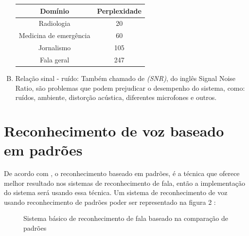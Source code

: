 \begin{enumerate}[A)]
\begin{table}[H]
\begin{tabular}{cc}
\hline %

Domínio & Perplexidade \\ %

\hline
\hline

Radiologia & 20 \\
Medicina de emergência & 60 \\
Jornalismo & 105 \\
Fala geral & 247 \\ 
\hline
\end{tabular}
\label{tab}
\end{table}

\item Relação sinal - ruído:
Também chamado de \textit{(SNR)}, do inglês Signal Noise Ratio, são problemas que podem prejudicar o desempenho do sistema, como: ruídos, ambiente, distorção acústica, diferentes microfones e outros.


\end{enumerate}

\section{Reconhecimento de voz baseado em padrões}\label{sec:red_neu}
De acordo com , o reconhecimento baseado em padrões, é a técnica que oferece melhor resultado nos sistemas de reconhecimento de fala, então a implementação do sistema será usando essa técnica.
Um sistema de reconhecimento de voz usando reconhecimento de padrões poder ser representado na figura 2 \cite{FundamentRabiner}:
 
\begin{figure}[H]
\centering

\caption{Sistema básico de reconhecimento de fala baseado na comparação de padrões}
\end{figure}

